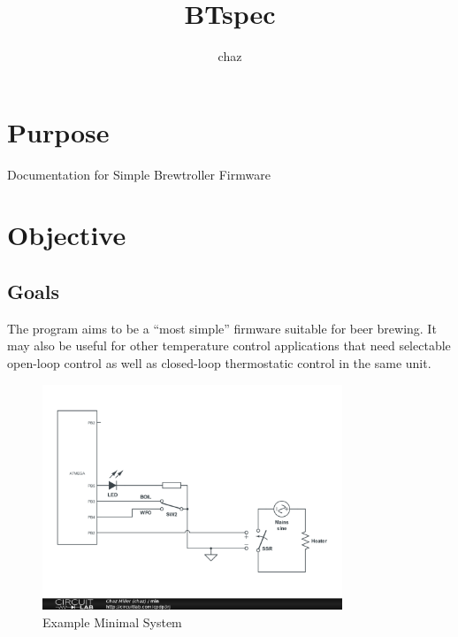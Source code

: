 \documentclass[dvips,12pt]{article}
\title{BTspec}
\author{chaz}
\begin{document}
\frenchspacing


\section{Purpose}
Documentation for Simple Brewtroller Firmware

\tableofcontents
\listoffigures


\section{Objective}

\subsection{Goals}

The program aims to be a ``most simple'' firmware suitable for beer
brewing. It may also be useful for other temperature control applications
that need selectable open-loop control as well as closed-loop thermostatic control in the same unit.

\begin{figure}[h]
    \begin{centering}
    \includegraphics[width=0.8\textwidth]{min}
    \caption{Example Minimal System}
    \label{fig:min}
    \end{centering}
\end{figure}
\end{document}
